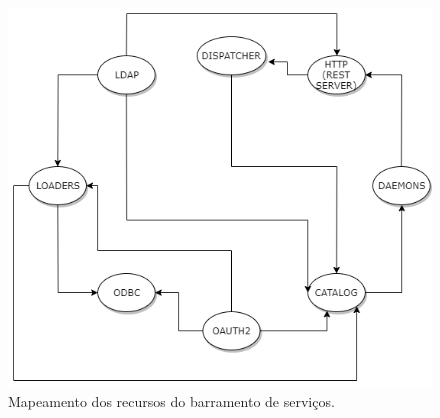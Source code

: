 \begin{figure}[h!]
	\begin{center}
	\includegraphics[scale = 0.70]{img/ResourcesEMS.png}
	\caption{Mapeamento dos recursos do barramento de serviços.}
	\label{fun:fig:ResourcesEMS}
	\end{center}
\end{figure}







